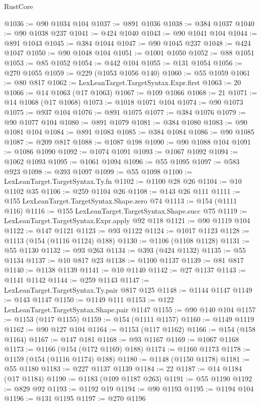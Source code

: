 \begin{lexlean}{RustCore}
\begin{coremodule}
@1036 := @90 @1034 @104
@1037 := @891 @1036
@1038 := @384 @1037
@1040 := @90 @1038 @237
@1041 := @424 @1040
@1043 := @90 @1041 @104
@1044 := @891 @1043
@1045 := @384 @1044
@1047 := @90 @1045 @237
@1048 := @424 @1047
@1050 := @90 @1048 @104
@1051 := @1001 @1050
@1052 := @88 @1051
@1053 := @85 @1052
@1054 := @442 @104
@1055 := @131 @1054
@1056 := @270 @1055
@1059 := @229 (@1053 @1056 @140)
@1060 := @55 @1059
@1061 := @80 @817
@1062 := LexLeanTarget.TargetSyntax.Expr.first
@1063 := 20
@1066 := @14 @1063 (@17 @1063)
@1067 := @109 @1066
@1068 := 21
@1071 := @14 @1068 (@17 @1068)
@1073 := @1018 @1071 @104
@1074 := @90 @1073
@1075 := @937 @104
@1076 := @891 @1075
@1077 := @384 @1076
@1079 := @90 @1077 @104
@1080 := @891 @1079
@1081 := @384 @1080
@1083 := @90 @1081 @104
@1084 := @891 @1083
@1085 := @384 @1084
@1086 := @90 @1085
@1087 := @209 @817
@1088 := @1087 @198
@1090 := @90 @1088 @104
@1091 := @1086 @1090
@1092 := @1074 @1091
@1093 := @1067 @1092
@1094 := @1062 @1093
@1095 := @1061 @1094
@1096 := @55 @1095
@1097 := @583 @923
@1098 := @393 @1097
@1099 := @55 @1098
@1100 := LexLeanTarget.TargetSyntax.Ty.fn
@1102 := @1100 @28 @26
@1104 := @10 @1102 @35
@1106 := @259 @1104 @26
@1108 := @143 @26 @111
@1111 := @155 LexLeanTarget.TargetSyntax.Shape.zero @74
@1113 := @154 (@1111 @116)
@1116 := @155 LexLeanTarget.TargetSyntax.Shape.succ @75
@1119 := LexLeanTarget.TargetSyntax.Expr.apply @92 @118
@1121 := @90 @1119 @104
@1122 := @147 @1121
@1123 := @93 @1122
@1124 := @1017 @1123
@1128 := @1113 (@154 (@1116 @1124) @188)
@1130 := @1106 (@1108 @1128)
@1131 := @55 @1130
@1132 := @93 @263
@1134 := @393 (@424 @1132)
@1135 := @55 @1134
@1137 := @10 @817 @23
@1138 := @1100 @1137
@1139 := @81 @817
@1140 := @1138 @1139
@1141 := @10 @1140
@1142 := @27 @1137
@1143 := @1141 @1142
@1144 := @259 @1143
@1147 := LexLeanTarget.TargetSyntax.Ty.pair @817 @125
@1148 := @1144 @1147
@1149 := @143 @1147
@1150 := @1149 @111
@1153 := @122 LexLeanTarget.TargetSyntax.Shape.pair @1147
@1155 := @90 @140 @104
@1157 := @1153 (@117 @1155)
@1159 := @154 (@1111 @1157)
@1160 := @1149 @1119
@1162 := @90 @127 @104
@1164 := @1153 (@117 @1162)
@1166 := @154 (@158 @1164)
@1167 := @147 @181
@1168 := @93 @1167
@1169 := @1067 @1168
@1173 := @1166 (@154 (@172 @1169) @188)
@1174 := @1160 @1173
@1178 := @1159 (@154 (@1116 @1174) @188)
@1180 := @1148 (@1150 @1178)
@1181 := @55 @1180
@1183 := @227 @1137 @1139
@1184 := 22
@1187 := @14 @1184 (@17 @1184)
@1190 := @1183 (@109 @1187 @263)
@1191 := @55 @1190
@1192 := @829 @92
@1193 := @1192 @19
@1194 := @90 @1193
@1195 := @1194 @104
@1196 := @131 @1195
@1197 := @270 @1196

\end{coremodule}
\end{lexlean}
